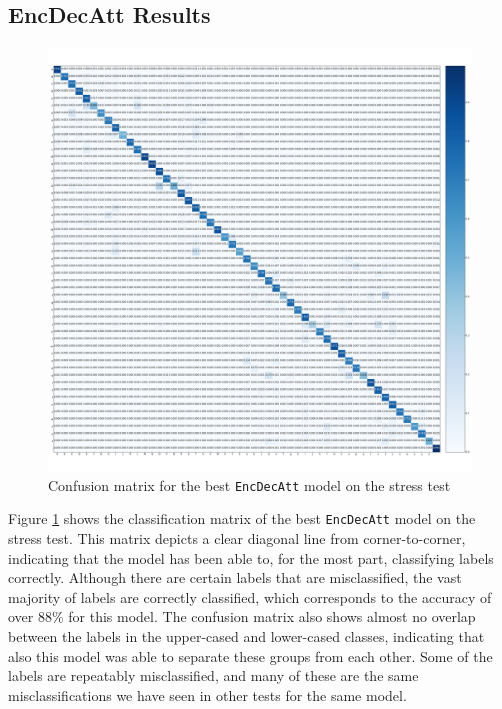 \newpage
\subsection{EncDecAtt Results}
\begin{figure}[ht]
    \centering
    \includegraphics[width=1\textwidth]{fig/results/experiment4/encdecatt/confusion_matrix.png}
    \caption{Confusion matrix for the best {\tt EncDecAtt} model on the stress test}
    \label{fig:result4_encdecatt_confusion_matrix}
\end{figure}

Figure \ref{fig:result4_encdecatt_confusion_matrix} shows the classification matrix of the best {\tt EncDecAtt} model on the stress test. This matrix depicts a clear diagonal line from corner-to-corner, indicating that the model has been able to, for the most part, classifying labels correctly. Although there are certain labels that are misclassified, the vast majority of labels are correctly classified, which corresponds to the accuracy of over 88\% for this model. The confusion matrix also shows almost no overlap between the labels in the upper-cased and lower-cased classes, indicating that also this model was able to separate these groups from each other. Some of the labels are repeatably misclassified, and many of these are the same misclassifications we have seen in other tests for the same model.

